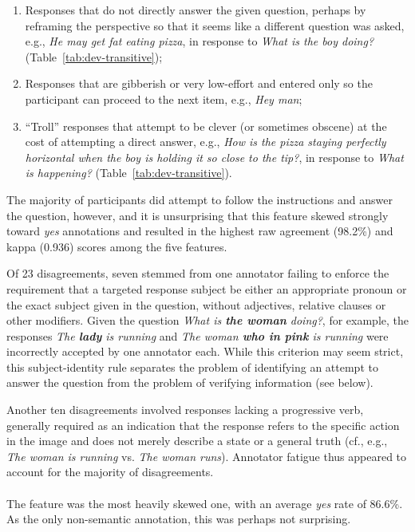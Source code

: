 \begin{enumerate}
\item Responses that do not directly answer the given question, perhaps by reframing the perspective so that it seems like a different question was asked, e.g., \textit{He may get fat eating pizza}, in response to \textit{What is the boy doing?} (Table~\ref{tab:dev-transitive});
\item Responses that are gibberish or very low-effort and entered only so the participant can proceed to the next item, e.g., \textit{Hey man};
\item ``Troll'' responses that attempt to be clever (or sometimes obscene) at the cost of attempting a direct answer, e.g., \textit{How is the pizza staying perfectly horizontal when the boy is holding it so close to the tip?}, in response to \textit{What is happening?} (Table~\ref{tab:dev-transitive}).
\end{enumerate}

The majority of participants did attempt to follow the instructions and answer the question, however, and it is unsurprising that this feature skewed strongly toward \textit{yes} annotations and resulted in the highest raw agreement (98.2\%) and kappa (0.936) scores among the five features.

Of 23 disagreements, seven stemmed from one annotator failing to enforce the requirement that a targeted response subject be either an appropriate pronoun or the exact subject given in the question, without adjectives, relative clauses or other modifiers. Given the question \textit{What is \textbf{the woman} doing?}, for example, the responses \textit{The \textbf{lady} is running} and \textit{The woman \textbf{who in pink} is running} were incorrectly accepted by one annotator each.  While this criterion may seem strict, this subject-identity rule separates the problem of identifying an attempt to answer the question from the problem of verifying information (see  below).

Another ten disagreements involved responses lacking a progressive verb, generally required as an indication that the response refers to the specific action in the image and does not merely describe a state or a general truth (cf., e.g., \textit{The woman is running} vs. \textit{The woman runs}). Annotator fatigue thus appeared to account for the majority of  disagreements.

\paragraph{} The  feature was the most heavily skewed one, with an average \textit{yes} rate of 86.6\%.  As the only non-semantic annotation, this was perhaps not surprising.


